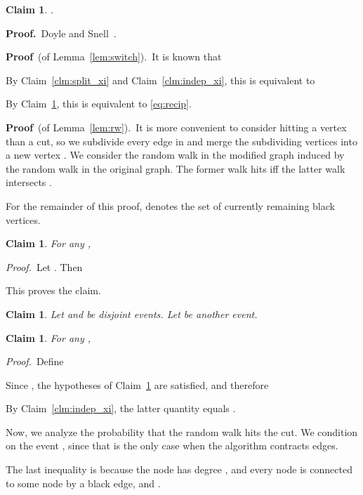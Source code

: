 \documentclass[11pt]{article}
\newcommand{\proofbelow}{8pt}
\numberwithin{equation}{section}
\newtheorem{claim}[theorem]{Claim}
\renewenvironment{proof}{\noindent\textbf{Proof.}\,}{\afterproof}
\newenvironment{proofof}[1]{\noindent\textbf{Proof} \,(of #1).\,}{\afterproof}
\newenvironment{subproof}{\noindent\textit{Proof.}\,}{\aftersubproof}
\newcommand{\afterproof}{\hfill  \par \vspace{\proofbelow}}
\newcommand{\aftersubproof}{\hfill  \par \vspace{\proofbelow}}
\newcommand{\ClaimName}[1]{\label{clm:#1}}
\newcommand{\Claim}[1]{Claim~\ref{clm:#1}}
\newcommand{\Lemma}[1]{Lemma~\ref{lem:#1}}
\begin{document}
\begin{claim}
\ClaimName{split_xi_2}
.
\end{claim}
\begin{proof}
Doyle and Snell~\cite[\S 1.3.4]{DoyleSnell}.
\end{proof}

\vspace{12pt}

\begin{proofof}{\Lemma{switch}}
It is known \cite[Theorem IX.22]{bollobas} that

By \Claim{split_xi} and \Claim{indep_xi}, this is equivalent to

By \Claim{split_xi_2}, this is equivalent to \eqref{eq:recip}.
\end{proofof}

\vspace{12pt}

\begin{proofof}{\Lemma{rw}}
It is more convenient to consider hitting a vertex than a cut,
so we subdivide every edge in  and merge the subdividing vertices into a new vertex .
We consider the random walk in the modified graph induced by the random walk in the
original graph.
The former walk hits  iff the latter walk intersects . 

For the remainder of this proof,  denotes the set of currently remaining black vertices.

\begin{claim}
\ClaimName{uw}
For any ,

\end{claim}
\begin{subproof}
Let .
Then

This proves the claim.
\end{subproof}

\begin{claim}
\ClaimName{given}
Let  and  be disjoint events. Let  be another event.

\end{claim}

\begin{claim}
\ClaimName{mess}
For any ,

\end{claim}
\begin{subproof}
Define

Since , the hypotheses of Claim~\ref{clm:given} are satisfied,
and therefore 

By \Claim{indep_xi}, the latter quantity equals
.
\end{subproof}


\vspace{12pt}

Now, we analyze the probability that the random walk hits the cut.
We condition on the event , since that is the only case when
the algorithm contracts edges.

The last inequality is because the node  has degree ,
and every node  is connected to some node 
by a black edge, and .
\end{proofof}
\end{document}
